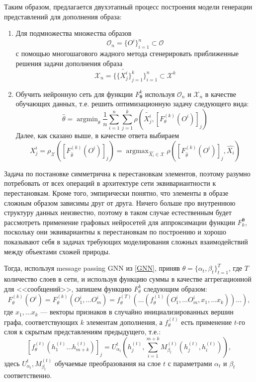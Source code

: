 \documentclass[a4paper,14pt]{extarticle}
\DeclareMathOperator*{\argmax}{argmax}
\DeclareMathOperator*{\argmin}{argmin}
\begin{document}
			Таким образом, предлагается двухэтапный процесс построения модели генерации представлений для дополнения образа:
			\begin{enumerate}
				\item Для подмножества множества образов 
				$$\mathcal{O}_n = \{O^i\}_{i=1}^n \subset\mathcal{O}$$
				 с помощью многошагового жадного метода сгенерировать приближенные решения задачи дополнения образа $$\mathcal{X}_n =\{\{\tilde{X_j^i}\}_{j=1}^k\}_{i=1}^n\subset\mathcal{X}^k$$
				  
				\item\label{step2} Обучить нейронную сеть для функции $F^{k}_\mathbf{\theta}$ используя $\mathcal{O}_n$ и $\mathcal{X}_n$ в качестве обучающих данных, т.е. решить оптимизационную задачу следующего вида:
				$$\hat{\theta} = \argmin_\theta \frac{1}{n}\sum_{i=1}^n\sum_{j=1}^k\rho\left(\tilde{X_j^i}, \left[F^{(k)}_{\theta}(O^i)\right]_j\right)$$
				Далее, как сказано выше, в качестве ответа выбираем
				$$X_j^i = \rho_\mathcal{X}\left(\left[F^{(k)}_{\hat{\theta}}(O^i)\right]_j\right) = \argmax_{\hat{X_i}\in\mathcal{X}}\rho\left(\left[F^{(k)}_{\hat{\theta}}(O^i)\right]_j, \hat{X_i}\right)$$
			\end{enumerate}
		
		
		Задача по постановке симметрична к перестановкам элементов, поэтому разумно потребовать от всех операций в архитектуре сети эквивариантности \cite{cohen2016group} к перестановкам. Кроме того, эмпирически понятно, что элементы в образе сложным образом зависимы друг от друга.
		Ничего больше про внутреннюю структуру данных неизвестно, поэтому в таком случае естественным будет рассмотреть применение графовых нейросетей для аппроксимации функции $F_k^\mathbf{\theta}$, поскольку они эквивариантны к перестановкам по построению и хорошо показывают себя в задачах требующих моделирования сложных взаимодействий между объектами схожей природы.
		
		Тогда, используя message passing GNN из \ref{GNN}, приняв $\theta = \{\alpha_t, \beta_t\}_{t=1}^{T}$, где $T$ количество слоев в сети, и используя функцию суммы в качестве аггрегационной для <<сообщений>>, запишем функцию $F^{k}_{\theta}$ следующим образом:
		$$F^{(k)}_{\theta}(O^i) = F^{(k)}_{\theta}(O^i_1,\dots O^i_m) = f_\theta^{(T)}\left(\dots \left(f_\theta^{(1)}(O^i_1,\dots O^i_m, x_1, \dots x_k)\right)\dots\right),$$
		где $x_1,\dots x_k$ --- векторы признаков в случайно инициализированных вершин графа, соответствующих $k$ элементам дополнения, а $f_\theta^{(t)}$ есть применение $t$-го слоя к скрытым представлениям предыдущего, т.е.:
		$$\left[f^{(t)}_\theta \left(h_1^{(t)}\dots h_{m+k}^{(t)}\right)\right]_j\! = U_{\alpha_t}^t\left(h^{(t)}_j, \sum_{i=1}^{m+k} M_{\beta_t}^{(t)}\left(h^{(t)}_j, h^{(t)}_i\right)   \right),$$
		здесь $U_{\alpha_t}^t, M_{\beta_t}^{(t)}$ обучаемые преобразования на слое $t$ с параметрами $\alpha_t$ и $\beta_t$ соответственно.
		
\end{document}
